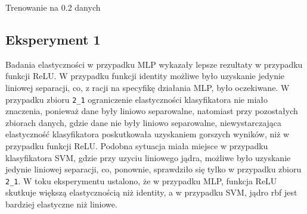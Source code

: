 \documentclass[12pt]{article}
\begin{document}
\begin{table}[H]
    \tiny
    \caption{Trenowanie na 0.2 danych}\label{tab:table}
\end{table}


\clearpage

\subsection*{Eksperyment 1}
Badania elastyczności w przypadku MLP wykazały lepsze rezultaty w 
przypadku funkcji ReLU. W przypadku funkcji identity możliwe było 
uzyskanie jedynie liniowej separacji, co, z racji na specyfikę działania 
MLP, było oczekiwane.
W przypadku zbioru \texttt{2\_1} ograniczenie
elastyczności klasyfikatora nie miało znaczenia, ponieważ dane były 
liniowo separowalne, natomiast przy pozostałych zbiorach danych, gdzie 
dane nie były liniowo separowalne, niewystarczająca elastyczność 
klasyfikatora poskutkowała uzyskaniem gorszych wyników, niż w przypadku 
funkcji ReLU. Podobna sytuacja miała miejsce w przypadku klasyfikatora SVM, 
gdzie przy uzyciu liniowego jądra, możliwe było uzyskanie jedynie 
liniowej separacji, co, ponownie, sprawdziło się tylko w przypadku 
zbioru \texttt{2\_1}.
W toku eksperymentu ustalono, że w przypadku MLP,
funkcja ReLU skutkuje większą elastycznością niż identity, 
a w przypadku SVM, jądro rbf jest bardziej elastyczne niż liniowe.
\end{document}
